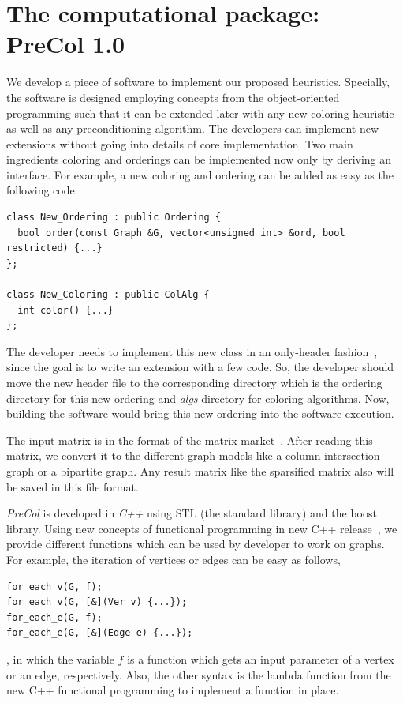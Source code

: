 \documentclass[12pt, twoside,a4paper,toc=bibliography]{scrbook}
\begin{document}
\section{The computational package: PreCol 1.0}
\label{s.extend}
We develop a piece of software to implement our proposed heuristics.
Specially, the software is designed employing concepts from the object-oriented programming
such that it can be extended later with any new coloring heuristic as well as any preconditioning algorithm.
The developers can implement new extensions without going into details of core implementation.
Two main ingredients coloring and orderings can be implemented now only by deriving an interface.
For example, a new coloring and ordering can be added as easy as the following code.
\begin{lstlisting}
class New_Ordering : public Ordering {
  bool order(const Graph &G, vector<unsigned int> &ord, bool restricted) {...}
};

class New_Coloring : public ColAlg {
  int color() {...}
};
\end{lstlisting}

The developer needs to implement this new class in an only-header fashion~\cite{headeronly},
since the goal is to write an extension with a few code. So, the developer should
move the new header file to the corresponding directory which is the ordering directory
for this new ordering and \textit{algs} directory for coloring algorithms.
Now, building the software would bring this new ordering into the software execution.

The input matrix is in the format of the matrix market~\cite{matrix-market}. 
After reading this matrix, we convert it to the different graph models 
like a column-intersection graph or a bipartite graph. 
Any result matrix like the sparsified matrix also will be saved in this file format.

\textit{PreCol} is developed in \textit{C++} using STL (the standard library) and
the boost library\cite{boost}.
Using new concepts of functional programming
in new C++ release~\cite{Sutherland2015}, we provide different functions which can be used
by developer to work on graphs. For example, the iteration of vertices
or edges can be easy as follows,
\begin{lstlisting}
for_each_v(G, f);
for_each_v(G, [&](Ver v) {...});
for_each_e(G, f);
for_each_e(G, [&](Edge e) {...});
\end{lstlisting}
, in which the variable $f$ is a function which gets an input parameter
of a vertex or an edge, respectively.
Also, the other syntax is the lambda function
from the new C++ functional programming to implement a function in place.
\end{document}

